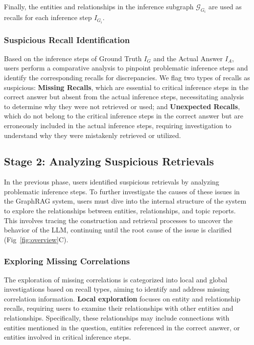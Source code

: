 Finally, the entities and relationships in the inference subgraph $\mathcal{G}_{G_i}$ are used as recalls for each inference step $I_{G_i}$.

\subsubsection{Suspicious Recall Identification}

Based on the inference steps of Ground Truth $I_G$ and the Actual Answer $I_A$, users perform a comparative analysis to pinpoint problematic inference steps and identify the corresponding recalls for discrepancies. We flag two types of recalls as suspicious: \textbf{Missing Recalls}, which are essential to critical inference steps in the correct answer but absent from the actual inference steps, necessitating analysis to determine why they were not retrieved or used; and \textbf{Unexpected Recalls}, which do not belong to the critical inference steps in the correct answer but are erroneously included in the actual inference steps, requiring investigation to understand why they were mistakenly retrieved or utilized.

\subsection{Stage 2: Analyzing Suspicious Retrievals}

In the previous phase, users identified suspicious retrievals by analyzing problematic inference steps. To further investigate the causes of these issues in the GraphRAG system, users must dive into the internal structure of the system to explore the relationships between entities, relationships, and topic reports. This involves tracing the construction and retrieval processes to uncover the behavior of the LLM, continuing until the root cause of the issue is clarified (Fig~\ref{fig:overview}C).

\subsubsection{Exploring Missing Correlations}

The exploration of missing correlations is categorized into local and global investigations based on recall types, aiming to identify and address missing correlation information. \textbf{Local exploration} focuses on entity and relationship recalls, requiring users to examine their relationships with other entities and relationships. Specifically, these relationships may include connections with entities mentioned in the question, entities referenced in the correct answer, or entities involved in critical inference steps.

